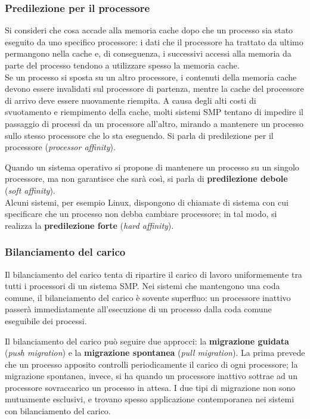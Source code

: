 \documentclass[11pt,a4paper]{article}
\begin{document}
\subsubsection{Predilezione per il processore}
Si consideri che cosa accade alla memoria cache dopo che un processo sia stato eseguito da
uno specifico processore: i dati che il processore ha trattato da ultimo permangono nella ca­che e, di conseguenza, i successivi accessi alla memoria da parte del processo tendono a uti­lizzare spesso la memoria cache.\\
Se un processo si sposta su un
altro processore, i contenuti della memoria cache devono essere invalidati sul processore di
partenza, mentre la cache del processore di arrivo deve essere nuovamente riempita. A causa
degli alti costi di svuotamento e riempimento della cache, molti sistemi SMP tentano di im­pedire il passaggio di processi da un processore all'altro, mirando a mantenere un processo
sullo stesso processore che lo sta eseguendo. Si parla di predilezione per il processore (\emph{pro­cessor affinity}).

Quando un sistema opera­tivo si propone di mantenere un processo su un singolo processore, ma non garantisce che
sarà così, si parla di \textbf{predilezione debole} (\emph{soft affinity}).\\
Alcuni sistemi, per esempio Linux, dispongono di
chiamate di sistema con cui specificare che un processo non debba cambiare processore; in
tal modo, si realizza la \textbf{predilezione forte} (\emph{hard affinity}).

\subsubsection{Bilanciamento del carico}
Il bilanciamento del carico tenta di ripartire il carico di lavoro
uniformemente tra tutti i processori di un sistema SMP.
Nei sistemi che mantengono una coda comune, il bilanciamento del carico è sovente superfluo: un processore inattivo passerà immediatamente all'esecuzione di
un processo dalla coda comune eseguibile dei processi.

Il
bilanciamento del carico può seguire due approcci: la \textbf{migrazione guidata} (\emph{push migration}) e la \textbf{migrazione spontanea} (\emph{pull migration}). La prima prevede che un processo ap­posito controlli periodicamente il carico di ogni processore; la migrazione spontanea, invece, si ha quando un processore inattivo sottrae
ad un processore sovraccarico un processo in attesa. I due tipi di migrazione non sono mu­tuamente esclusivi, e trovano spesso applicazione contemporanea nei sistemi con bilancia­mento del carico.
\end{document}
